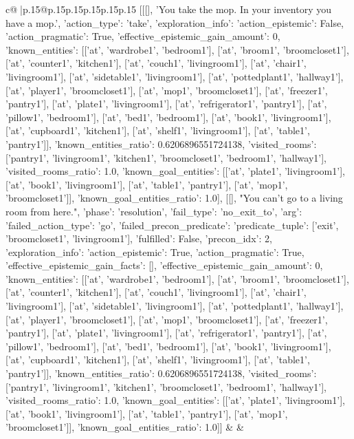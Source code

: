\documentclass{article}
\begin{document}
{\begin{supertabular}{c@{$\;$}|p{.15\linewidth}@{}p{.15\linewidth}p{.15\linewidth}p{.15\linewidth}p{.15\linewidth}p{.15\linewidth}}
{{{	 [[[], 'You take the mop. In your inventory you have a mop.', {'action_type': 'take', 'exploration_info': {'action_epistemic': False, 'action_pragmatic': True, 'effective_epistemic_gain_amount': 0, 'known_entities': [['at', 'wardrobe1', 'bedroom1'], ['at', 'broom1', 'broomcloset1'], ['at', 'counter1', 'kitchen1'], ['at', 'couch1', 'livingroom1'], ['at', 'chair1', 'livingroom1'], ['at', 'sidetable1', 'livingroom1'], ['at', 'pottedplant1', 'hallway1'], ['at', 'player1', 'broomcloset1'], ['at', 'mop1', 'broomcloset1'], ['at', 'freezer1', 'pantry1'], ['at', 'plate1', 'livingroom1'], ['at', 'refrigerator1', 'pantry1'], ['at', 'pillow1', 'bedroom1'], ['at', 'bed1', 'bedroom1'], ['at', 'book1', 'livingroom1'], ['at', 'cupboard1', 'kitchen1'], ['at', 'shelf1', 'livingroom1'], ['at', 'table1', 'pantry1']], 'known_entities_ratio': 0.6206896551724138, 'visited_rooms': ['pantry1', 'livingroom1', 'kitchen1', 'broomcloset1', 'bedroom1', 'hallway1'], 'visited_rooms_ratio': 1.0, 'known_goal_entities': [['at', 'plate1', 'livingroom1'], ['at', 'book1', 'livingroom1'], ['at', 'table1', 'pantry1'], ['at', 'mop1', 'broomcloset1']], 'known_goal_entities_ratio': 1.0}}], [[], "You can't go to a living room from here.", {'phase': 'resolution', 'fail_type': 'no_exit_to', 'arg': {'failed_action_type': 'go', 'failed_precon_predicate': {'predicate_tuple': ['exit', 'broomcloset1', 'livingroom1'], 'fulfilled': False, 'precon_idx': 2}}, 'exploration_info': {'action_epistemic': True, 'action_pragmatic': True, 'effective_epistemic_gain_facts': [], 'effective_epistemic_gain_amount': 0, 'known_entities': [['at', 'wardrobe1', 'bedroom1'], ['at', 'broom1', 'broomcloset1'], ['at', 'counter1', 'kitchen1'], ['at', 'couch1', 'livingroom1'], ['at', 'chair1', 'livingroom1'], ['at', 'sidetable1', 'livingroom1'], ['at', 'pottedplant1', 'hallway1'], ['at', 'player1', 'broomcloset1'], ['at', 'mop1', 'broomcloset1'], ['at', 'freezer1', 'pantry1'], ['at', 'plate1', 'livingroom1'], ['at', 'refrigerator1', 'pantry1'], ['at', 'pillow1', 'bedroom1'], ['at', 'bed1', 'bedroom1'], ['at', 'book1', 'livingroom1'], ['at', 'cupboard1', 'kitchen1'], ['at', 'shelf1', 'livingroom1'], ['at', 'table1', 'pantry1']], 'known_entities_ratio': 0.6206896551724138, 'visited_rooms': ['pantry1', 'livingroom1', 'kitchen1', 'broomcloset1', 'bedroom1', 'hallway1'], 'visited_rooms_ratio': 1.0, 'known_goal_entities': [['at', 'plate1', 'livingroom1'], ['at', 'book1', 'livingroom1'], ['at', 'table1', 'pantry1'], ['at', 'mop1', 'broomcloset1']], 'known_goal_entities_ratio': 1.0}}]] 
	  } 
	   } 
	   } 
	 & & \\ 
 


\end{supertabular}}
\end{document}
